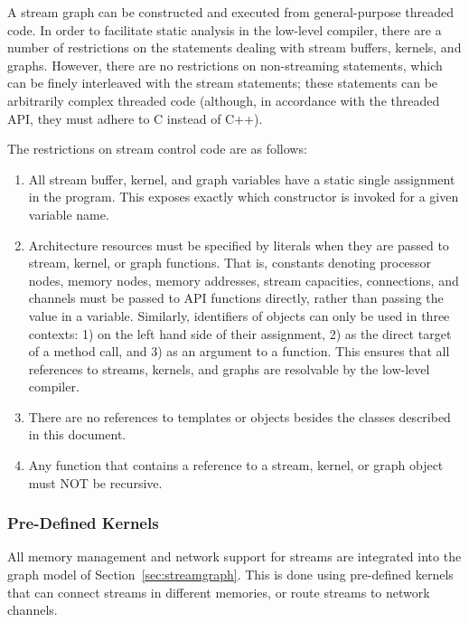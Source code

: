 
A stream graph can be constructed and executed from general-purpose
threaded code.  In order to facilitate static analysis in the
low-level compiler, there are a number of restrictions on the
statements dealing with stream buffers, kernels, and graphs.  However,
there are no restrictions on non-streaming statements, which can be
finely interleaved with the stream statements; these statements can be
arbitrarily complex threaded code (although, in accordance with the
threaded API, they must adhere to C instead of C++).

The restrictions on stream control code are as follows:

\begin{enumerate}

\item All stream buffer, kernel, and graph variables have a static
single assignment in the program.  This exposes exactly which
constructor is invoked for a given variable name.

\item Architecture resources must be specified by literals when they
are passed to stream, kernel, or graph functions.  That is, constants
denoting processor nodes, memory nodes, memory addresses, stream
capacities, connections, and channels must be passed to API functions
directly, rather than passing the value in a variable.  Similarly,
identifiers of objects can only be used in three contexts: 1) on the
left hand side of their assignment, 2) as the direct target of a
method call, and 3) as an argument to a function.  This ensures that
all references to streams, kernels, and graphs are resolvable by the
low-level compiler.

\item There are no references to templates or objects besides the
classes described in this document.

\item Any function that contains a reference to a stream, kernel, or
graph object must NOT be recursive.

\end{enumerate}

\subsubsection{Pre-Defined Kernels}
\label{sec:predef}

All memory management and network support for streams are integrated
into the graph model of Section~\ref{sec:streamgraph}.  This is done
using pre-defined kernels that can connect streams in different
memories, or route streams to network channels.

